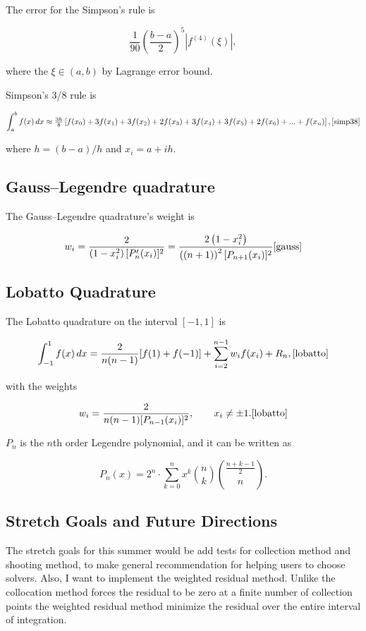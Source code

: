 \documentclass[a4paper,12pt,onecolumn]{article}
\begin{document}
The error for the Simpson's rule is

\[{\frac{1}{90}}\left({\frac{b-a}{2}}\right)^{5}\left|f^{{(4)}}(\xi )\right|,\]

where the $\xi \in (a, b)$ by Lagrange error bound. \cite{simp}

Simpson's 3/8 rule is

\[\int _{a}^{b}f(x)\,dx\approx {\tfrac {3h}{8}}\left[f(x_{0})+3f(x_{1})+3f(x_{2})+
2f(x_{3})+3f(x_{4})+3f(x_{5})+2f(x_{6})+...+f(x_{n})\right], \cite{simp38}\]

where $h=(b-a)/h$ and $x_i = a+ih$.

\subsection{Gauss–Legendre quadrature}
The Gauss–Legendre quadrature's weight is

\[w_{i}={\frac {2}{\left(1-x_{i}^{2}\right)[P'_{n}(x_{i})]^{2}}}=
\frac{2\left(1-x_{i}^2\right)}{\left((n+1)\right)^2[P_{n+1}(x_{i})]^{2}} \cite{gauss}\]

\subsection{Lobatto Quadrature}
The Lobatto quadrature on the interval $[-1,1]$ is

\[\int _{-1}^{1}{f(x)\,dx} = \frac{2}{n(n-1)}[f(1)+f(-1)] + \sum _{i=2}^{n-1}{w_{i}f(x_{i})}+R_{n},
\cite{lobatto}\]

with the weights

\[w_{i}={\frac {2}{n(n-1)[P_{n-1}(x_{i})]^{2}}},\qquad x_{i}\neq \pm 1. \cite{lobatto}\]

$P_n$ is the $n$th order Legendre polynomial, and it can be written as

\[P_{n}(x)=2^{n} \cdot \sum _{k=0}^{n}x^{k}\binom{n}{k}\binom{{\frac {n+k-1}{2}}}{n}.\]

\subsection{Stretch Goals and Future Directions}
The stretch goals for this summer would be add tests for collection method and shooting method, to
make general recommendation for helping users to choose solvers. Also, I want to implement the weighted
residual method. Unlike the collocation method forces the residual to be zero at a finite number
of collection points the weighted residual method minimize the residual over the entire interval of
integration.
\end{document}
